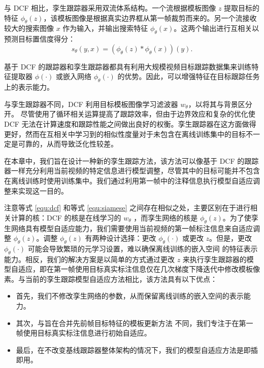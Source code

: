 与 DCF 相比，孪生跟踪器采用双流体系结构。一个流根据模板图像 $z$ 提取目标的特征 $\phi_\theta(z)$，该模板图像是根据真实边界框从第一帧裁剪而来的。另一个流接收较大的搜索图像 $x$ 作为输入，并输出搜索特征 $\phi_\theta(x)$。这两个输出进行互相关以预测目标置信度得分：
\begin{equation}
    s_\theta(y,x)=(\phi_\theta(z) * \phi_\theta(x))(y).
    \label{equ:siamese}
\end{equation}

基于 DCF 的跟踪器和孪生跟踪器都具有利用大规模视频目标跟踪数据集来训练特征提取器 $\phi(\cdot)$ 或嵌入网络 $\phi_{\theta}(\cdot)$ 的优势。因此，可以增强特征在目标跟踪任务上的表示能力。

与孪生跟踪器不同，DCF 利用目标模板图像学习滤波器 $w_\theta$，以将其与背景区分开。
尽管使用了循环相关运算提高了跟踪效率，但由于边界效应和复杂的优化使 DCF 无法在计算速度和跟踪性能之间做出良好的权衡。孪生跟踪器在这方面做得更好，然而在互相关中学习到的相似性度量对于未包含在离线训练集中的目标不一定是可靠的，从而导致泛化性较差。

在本章中，我们旨在设计一种新的孪生跟踪方法，该方法可以像基于 DCF 的跟踪器一样充分利用当前视频的特定信息进行模型调整，尽管其中的目标可能并不包含在离线训练时使用训练集中。我们通过利用第一帧中的注释信息执行模型自适应调整来实现这一目的。

注意等式 \ref{equ:dcf} 和等式 \ref{equ:siamese} 之间存在相似之处，主要区别在于进行相关计算的核：DCF 的核是在线学习的 $w_{\theta}$ ，而孪生网络的核是 $\phi_\theta(z)$。为了使孪生网络具有模型自适应能力，我们需要使用当前视频的第一帧标注信息来自适应调整 $\phi_\theta(z)$。调整 $\phi_\theta(z)$ 有两种设计选择：更改 $\phi_\theta(\cdot)$ 或更改 $z$。但是，更改 $\phi_\theta(\cdot)$ 可能会导致繁琐的元学习设置，难以确保离线训练的嵌入空间 \cite{ROAM, DBLP:conf/aaai/JungYNCH20}的特征表示能力。相反，我们的解决方案是以简单的方式通过更改 $z$ 来执行孪生跟踪器的模型自适应，即在第一帧使用目标真实标注信息仅在几次梯度下降迭代中修改模板像素。与当前的孪生跟踪模型自适应方法相比，该方法具有以下优点：

\begin{itemize}
\item 首先，我们不修改孪生网络的参数，从而保留离线训练的嵌入空间的表示能力。
\item 其次，与旨在合并先前帧目标特征的模板更新方法 \cite{zhu2018distractor, Zhang_2019_ICCV} 不同，我们专注于在第一帧使用目标真实标注信息进行初始自适应。
\item 最后，在不改变基线跟踪器整体架构的情况下，我们的模型自适应方法是即插即用。
\end{itemize}

